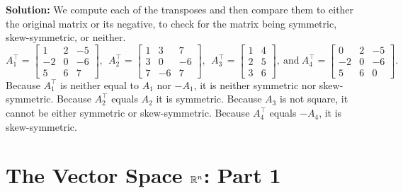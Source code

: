 \documentclass[letterpaper]{book}
\begin{document}
\noindent \textbf{Solution:}
We compute each of the transposes and then compare them to either the original matrix or its negative, to check for the matrix being symmetric, skew-symmetric, or neither.
$$
A_1^\top=\left[
\begin{array}{rrr}
1 & 2 & -5\\
-2 & 0 & -6\\
5 & 6 & 7
\end{array} \right],~~A_2^\top=\left[
\begin{array}{rrr}
1 & 3 & 7\\
3 & 0 & -6\\
7 & -6 & 7
\end{array} \right],~~
A_3^\top=\left[
\begin{array}{cc}
1 & 4 \\
2 & 5 \\
3 & 6
\end{array} \right], ~\text{and}~A_4^\top=\left[
\begin{array}{rrr}
0& 2 & -5\\
-2 & 0 & -6\\
5 & 6 & 0
\end{array} \right].
$$
Because $A_1^\top$ is neither equal to $A_1$ nor $-A_1$, it is neither symmetric nor skew-symmetric. Because $A_2^\top$ equals $A_2$ it is symmetric. Because $A_3$ is not square, it cannot be either symmetric or skew-symmetric. Because $A_4^\top$ equals $-A_4$, it is skew-symmetric.
\Qed

\setcounter{chapter}{7}
\setcounter{section}{-1}
\section{The Vector Space $\mathbb R^n$: Part 1}
\end{document}
